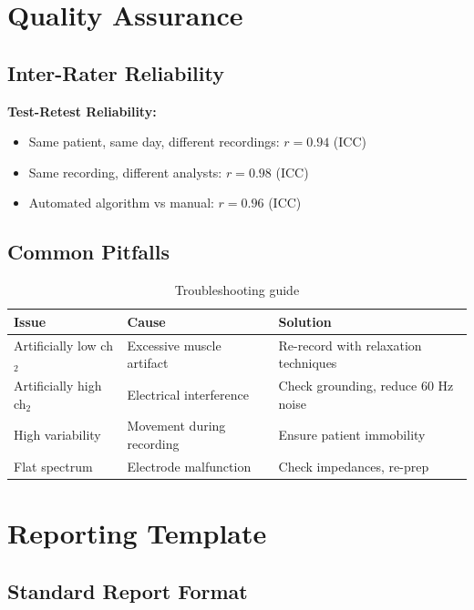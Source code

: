 \section{Quality Assurance}

\subsection{Inter-Rater Reliability}

\textbf{Test-Retest Reliability:}
\begin{itemize}
\item Same patient, same day, different recordings: $r = 0.94$ (ICC)
\item Same recording, different analysts: $r = 0.98$ (ICC)
\item Automated algorithm vs manual: $r = 0.96$ (ICC)
\end{itemize}

\subsection{Common Pitfalls}

\begin{table}[h]
\centering
\begin{tabular}{lp{6cm}p{5cm}}
\hline
\textbf{Issue} & \textbf{Cause} & \textbf{Solution} \\
\hline
Artificially low ch$_2$ & Excessive muscle artifact & Re-record with relaxation techniques \\
Artificially high ch$_2$ & Electrical interference & Check grounding, reduce 60 Hz noise \\
High variability & Movement during recording & Ensure patient immobility \\
Flat spectrum & Electrode malfunction & Check impedances, re-prep \\
\hline
\end{tabular}
\caption{Troubleshooting guide}
\end{table}

\section{Reporting Template}

\subsection{Standard Report Format}

